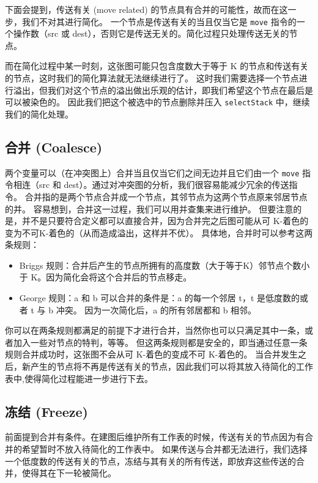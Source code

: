 下面会提到，传送有关 (move related) 的节点具有合并的可能性，故而在这一步，我们不对其进行简化。
一个节点是传送有关的当且仅当它是 \texttt{move} 指令的一个操作数（src 或 dest），否则它是传送无关的。简化过程只处理传送无关的节点。

而在简化过程中某一时刻，这张图可能只包含度数大于等于 K 的节点和传送有关的节点，这时我们的简化算法就无法继续进行了。
这时我们需要选择一个节点进行溢出，但我们对这个节点的溢出做出乐观的估计，即我们希望这个节点在最后是可以被染色的。
因此我们把这个被选中的节点删除并压入 \texttt{selectStack} 中，继续我们的简化处理。

\subsection{合并 (Coalesce)}

两个变量可以（在冲突图上）合并当且仅当它们之间无边并且它们由一个 \texttt{move} 指令相连（src 和 dest）。通过对冲突图的分析，我们很容易能减少冗余的传送指令。
合并指的是两个节点合并成一个节点，其邻节点为这两个节点原来邻居节点的并。
容易想到，合并这一过程，我们可以用并查集来进行维护。
但要注意的是，并不是只要符合定义都可以直接合并，因为合并完之后图可能从可 K-着色的变为不可K-着色的（从而造成溢出，这样并不优）。
具体地，合并时可以参考这两条规则：
\begin{itemize}
    \item Briggs 规则：合并后产生的节点所拥有的高度数（大于等于K）邻节点个数小于 K。因为简化会将这个合并后的节点移走。
    \item George 规则：a 和 b 可以合并的条件是：a 的每一个邻居 t，t 是低度数的或者 t 与 b 冲突。
    因为一次简化后，a 的所有邻居都和 b 相邻。
\end{itemize}

你可以在两条规则都满足的前提下才进行合并，当然你也可以只满足其中一条，或者加入一些对节点的特判，等等。
但这两条规则都是安全的，即当通过任意一条规则合并成功时，这张图不会从可 K-着色的变成不可 K-着色的。
当合并发生之后，新产生的节点将不再是传送有关的节点，因此我们可以将其放入待简化的工作表中,使得简化过程能进一步进行下去。

\subsection{冻结 (Freeze)}

前面提到合并有条件。在建图后维护所有工作表的时候，传送有关的节点因为有合并的希望暂时不放入待简化的工作表中。
如果传送与合并都无法进行，我们选择一个低度数的传送有关的节点，冻结与其有关的所有传送，即放弃这些传送的合并，使得其在下一轮被简化。

